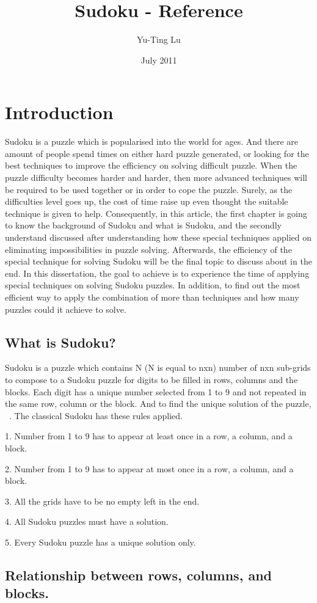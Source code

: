 \documentclass[11pt]{report}
\begin{document}
\title{Sudoku - Reference}
\author{Yu-Ting Lu}
\date{July 2011}
\maketitle

\tableofcontents

\chapter{Introduction}
\label{cha:Introduction}


Sudoku is a puzzle which is popularised into the world for ages. And there are amount of people spend times on either hard puzzle generated, or looking for the best techniques to improve the efficiency on solving difficult puzzle.
When the puzzle difficulty becomes harder and harder, then more advanced techniques will be required to be used together or in order to cope the puzzle. Surely, as the difficulties level goes up, the cost of time raise up even thought the suitable technique is given to help. Consequently, in this article, the first chapter is going to know the background of Sudoku and what is Sudoku, and the secondly understand discussed after understanding how these special techniques applied on eliminating impossibilities in puzzle solving. Afterwards, the efficiency of the special technique for solving Sudoku will be the final topic to discuss about in the end.
In this dissertation, the goal to achieve is to experience the time of applying special techniques on solving Sudoku puzzles. In addition, to find out the most efficient way to apply the combination of more than techniques and how many puzzles could it achieve to solve.


\section{What is Sudoku?}
\label{sec:whatissudoku}

Sudoku is a puzzle which contains N (N is equal to nxn) number of nxn sub-grids to compose to a Sudoku puzzle for digits to be filled in rows, columns and the blocks. Each digit has a unique number selected from 1 to 9 and not repeated in the same row, column or the block.
And to find the unique solution of the puzzle,  ~\cite{Berthier2007Sudoku}.
The classical Sudoku has these rules applied.

1. Number from 1 to 9 has to appear at least once in a row, a column, and a block.

2. Number from 1 to 9 has to appear at most once in a row, a column, and a block.

3. All the grids have to be no empty left in the end.

4. All Sudoku puzzles must have a solution.

5. Every Sudoku puzzle has a unique solution only.


\section{Relationship between rows, columns, and blocks.}
\label{sec:Relationship}








\end{document}

